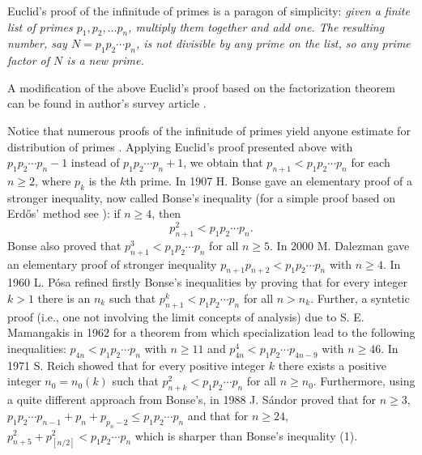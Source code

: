 \documentclass[12pt]{amsart}
\begin{document}
Euclid's proof of the infinitude of primes is a paragon of simplicity: 
{\it given a finite list of 
primes $p_1,p_2,\ldots p_n$, multiply them together and add one. 
The resulting number, say $N=p_1p_2\cdots p_n$,
is not divisible by any prime on the list, so any prime factor of $N$ is a
new prime.}

A modification of the above Euclid's proof based on the factorization 
theorem can be found in author's survey article \cite[p. 35, Section 4]{me}. 

Notice that numerous  proofs of the infinitude of primes
yield anyone estimate for distribution of primes \cite{me}.  
Applying  Euclid's proof presented above with $p_1p_2\cdots p_n-1$
instead of $p_1p_2\cdots p_n+1$, we obtain that 
$p_{n+1}<p_1p_2\cdots p_n$ for each $n\ge 2$, where $p_k$ is the $k$th prime.
In 1907 H. Bonse \cite{bo} gave an elementary proof of a stronger inequality, 
now called  Bonse's inequality (for a simple proof   
based on Erd\H{o}s'  method \cite{er} see  \cite[p. 238, Section 4.6]{sa4}):
if $n\ge 4$, then 
  \begin{equation}
p_{n+1}^2<p_1p_2\cdots p_n.
    \end{equation} 
Bonse also proved that $p_{n+1}^3<p_1p_2\cdots p_n$ for all $n\ge 5$.
In 2000 M. Dalezman  \cite[Theorem 1]{dal}
gave an elementary proof of stronger inequality 
$p_{n+1}p_{n+2}<p_1p_2\cdots p_n$ with $n\ge 4$.
 In  1960  L. P\'{o}sa  refined firstly 
 Bonse's inequalities by proving that for every integer $k>1$ 
there is an $n_k$ such that $p_{n+1}^k<p_1p_2\cdots p_n$ for all $n>n_k$.
Further, a syntetic proof (i.e., one not involving the limit concepts of 
analysis) due to S. E.  Mamangakis in 1962 \cite{ma} for a theorem from which 
specialization lead to the following inequalities: $p_{4n}<p_1p_2\cdots p_n$ 
with $n\ge 11$ and $p_{4n}^4<p_1p_2\cdots p_{4n-9}$ with $n\ge 46$. 
In 1971 S. Reich  \cite{re}
showed that for every positive integer $k$ there exists a positive 
integer $n_0=n_0(k)$ such that $p_{n+k}^2<p_1p_2\cdots p_n$ for all
$n\ge n_0$. Furthermore, using a quite different approach from Bonse's, 
in 1988 J. S\'{a}ndor \cite{sa} proved that for $n\ge 3$, 
 $p_1p_2\cdots p_{n-1}+p_n+p_{p_n-2}\le p_1p_2\cdots p_n$
and that for $n\ge 24$,  $p_{n+5}^2+p_{[n/2]}^2<p_1p_2\cdots p_n$   which is 
sharper than Bonse's inequality (1). 
\end{document}
